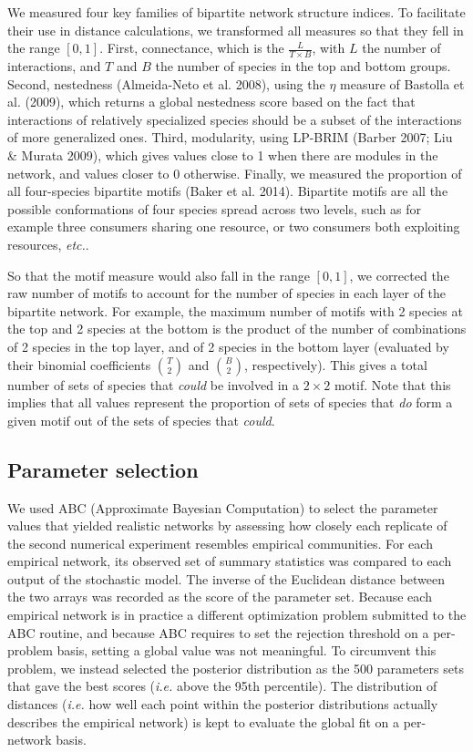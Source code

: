 \documentclass[12pt]{article}
\begin{document}
We measured four key families of bipartite network structure indices. To
facilitate their use in distance calculations, we transformed all
measures so that they fell in the range \([0,1]\). First, connectance,
which is the \(\frac{L}{T\times B}\), with \(L\) the number of
interactions, and \(T\) and \(B\) the number of species in the top and
bottom groups. Second, nestedness (Almeida-Neto et al. 2008), using the
\(\eta\) measure of Bastolla et al. (2009), which returns a global
nestedness score based on the fact that interactions of relatively
specialized species should be a subset of the interactions of more
generalized ones. Third, modularity, using LP-BRIM (Barber 2007; Liu \&
Murata 2009), which gives values close to 1 when there are modules in
the network, and values closer to 0 otherwise. Finally, we measured the
proportion of all four-species bipartite motifs (Baker et al. 2014).
Bipartite motifs are all the possible conformations of four species
spread across two levels, such as for example three consumers sharing
one resource, or two consumers both exploiting resources, \emph{etc.}.

So that the motif measure would also fall in the range \([0,1]\), we
corrected the raw number of motifs to account for the number of species
in each layer of the bipartite network. For example, the maximum number
of motifs with 2 species at the top and 2 species at the bottom is the
product of the number of combinations of 2 species in the top layer, and
of 2 species in the bottom layer (evaluated by their binomial
coefficients \({T \choose 2}\) and \({B \choose 2}\), respectively).
This gives a total number of sets of species that \emph{could} be
involved in a \(2 \times 2\) motif. Note that this implies that all
values represent the proportion of sets of species that \emph{do} form a
given motif out of the sets of species that \emph{could}.

\subsection{Parameter selection}\label{parameter-selection}

We used ABC (Approximate Bayesian Computation) to select the parameter
values that yielded realistic networks by assessing how closely each
replicate of the second numerical experiment resembles empirical
communities. For each empirical network, its observed set of summary
statistics was compared to each output of the stochastic model. The
inverse of the Euclidean distance between the two arrays was recorded as
the score of the parameter set. Because each empirical network is in
practice a different optimization problem submitted to the ABC routine,
and because ABC requires to set the rejection threshold on a per-problem
basis, setting a global value was not meaningful. To circumvent this
problem, we instead selected the posterior distribution as the 500
parameters sets that gave the best scores (\emph{i.e.} above the 95th
percentile). The distribution of distances (\emph{i.e.} how well each
point within the posterior distributions actually describes the
empirical network) is kept to evaluate the global fit on a per-network
basis.
\end{document}
